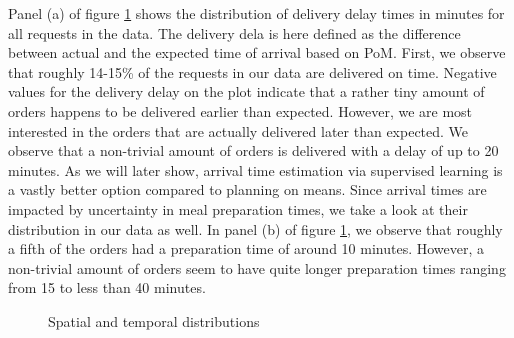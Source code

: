 Panel (a) of figure \ref{fig:prepdelay} shows the distribution of delivery delay times in minutes for all requests in the data. The delivery dela is here defined as the difference between actual and the expected time of arrival based on PoM. First, we observe that roughly 14-15\% of the requests in our data are delivered on time. Negative values for the delivery delay on the plot indicate that a rather tiny amount of orders happens to be delivered earlier than expected. However, we are most interested in the orders that are actually delivered later than expected. We observe that a non-trivial amount of orders is delivered with a delay of up to 20 minutes. As we will later show, arrival time estimation via supervised learning is a vastly better option compared to planning on means.
Since arrival times are impacted by uncertainty in meal preparation times, we take a look at their distribution in our data as well. In panel (b) of figure \ref{fig:prepdelay}, we observe that roughly a fifth of the orders had a preparation time of around 10 minutes. However, a non-trivial amount of orders seem to have quite longer preparation times ranging from 15 to less than 40 minutes. 
\begin{figure}[h]
	\centering
	\caption{Spatial and temporal distributions}
	\label{fig:prepdelay}
\end{figure}

